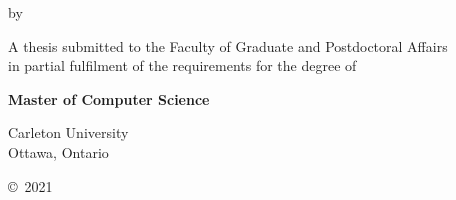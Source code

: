 \makeatletter
\begin{titlepage}
    \begin{center}
      \vspace*{1cm}
      {\LARGE\bfseries \@title}

      \vspace{1cm}
      by
      \vspace{1cm}

      {\itshape\large \@author\/}

      \vfill

      A thesis submitted to the Faculty of Graduate and Postdoctoral Affairs\\
      in partial fulfilment of the requirements for the degree of

      \vspace{3cm}
      {\bfseries Master of Computer Science}
      \vspace{3cm}


      {\@date}
      \vspace{0.5cm}

      Carleton University\\
      Ottawa, Ontario
      \vspace{0.5cm}

      \copyright{}~2021 \@author%
    \end{center}
\end{titlepage}
\makeatother

